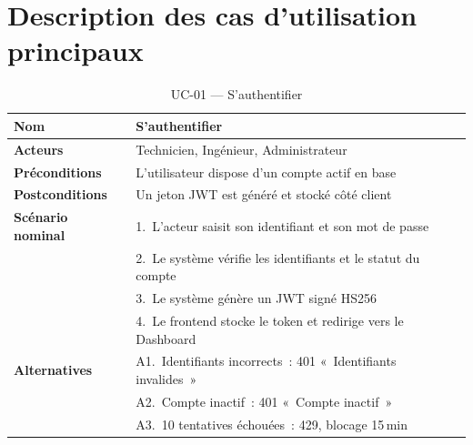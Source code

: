 \section{Description des cas d'utilisation principaux}

\begin{table}[H]
  \centering
  \caption{UC-01 --- S'authentifier}
  \label{tab:uc01}
  \begin{tabular}{|L{3.5cm}|L{10cm}|}
    \hline
    \textbf{Nom} & S'authentifier \\
    \hline
    \textbf{Acteurs} & Technicien, Ingénieur, Administrateur \\
    \hline
    \textbf{Préconditions} & L'utilisateur dispose d'un compte actif en base \\
    \hline
    \textbf{Postconditions} & Un jeton JWT est généré et stocké côté client \\
    \hline
    \textbf{Scénario nominal} &
      1.~L'acteur saisit son identifiant et son mot de passe \\
    & 2.~Le système vérifie les identifiants et le statut du compte \\
    & 3.~Le système génère un JWT signé HS256 \\
    & 4.~Le frontend stocke le token et redirige vers le Dashboard \\
    \hline
    \textbf{Alternatives} &
      A1.~Identifiants incorrects~: 401 «~Identifiants invalides~» \\
    & A2.~Compte inactif~: 401 «~Compte inactif~» \\
    & A3.~10 tentatives échouées~: 429, blocage 15\,min \\
    \hline
  \end{tabular}
\end{table}

